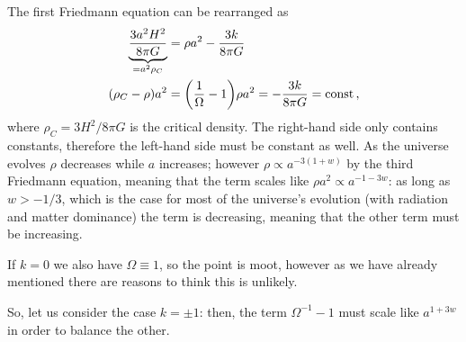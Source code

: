\documentclass[main.tex]{subfiles}
\begin{document}
The first Friedmann equation can be rearranged as 
%
\begin{align}
\underbrace{\frac{3 a^2 H^2}{8 \pi G}}_{= a^2 \rho_C} &= \rho a^2 - \frac{3k}{8 \pi G}  \\
(\rho_C - \rho ) a^2 &= 
\qty( \frac{1}{\Omega } - 1) \rho a^2
= - \frac{3k}{8 \pi G} = \text{const}
\,,
\end{align}
%
where \(\rho _C = 3 H^2 / 8 \pi G\) is the critical density. The right-hand side only contains constants, therefore the left-hand side must be constant as well.
As the universe evolves \(\rho \) decreases while \(a\) increases; however \(\rho \propto a^{-3 (1+w)}\) by the third Friedmann equation, meaning that the term scales like \(\rho a^2 \propto a^{-1 - 3 w}\): as long as \(w > -1/3\), which is the case for most of the universe's evolution (with radiation and matter dominance) the term is decreasing, meaning that the other term must be increasing. 

If \(k = 0\) we also have \(\Omega \equiv 1\), so the point is moot, however as we have already mentioned there are reasons to think this is unlikely. 

So, let us consider the case \(k = \pm 1\): then, the term \(\Omega^{-1}- 1\) must scale like \(a^{1 + 3 w}\) in order to balance the other. 
\end{document}
